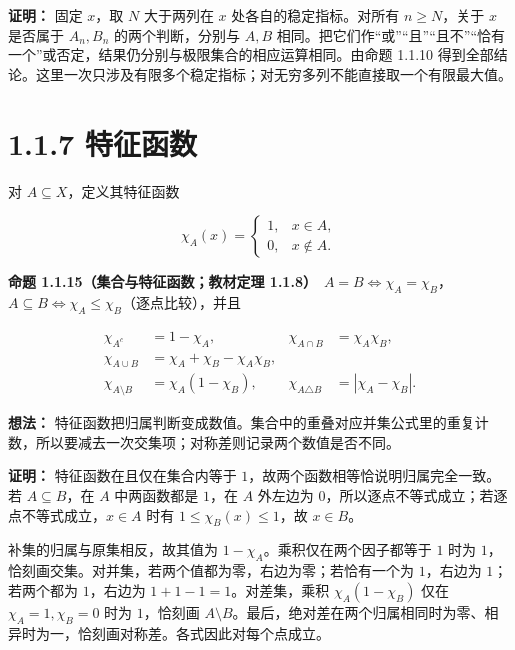 \documentclass[11pt,a4paper]{article}
\begin{document}
\textbf{证明：} 固定 \(x\)，取 \(N\) 大于两列在 \(x\)
处各自的稳定指标。对所有 \(n\ge N\)，关于 \(x\) 是否属于 \(A_n,B_n\)
的两个判断，分别与 \(A,B\)
相同。把它们作``或''``且''``且不''``恰有一个''或否定，结果仍分别与极限集合的相应运算相同。由命题
1.1.10
得到全部结论。这里一次只涉及有限多个稳定指标；对无穷多列不能直接取一个有限最大值。

\section[\S{}1.1.7 特征函数]{1.1.7 特征函数}\label{ux7279ux5f81ux51fdux6570}

对 \(A\subseteq X\)，定义其特征函数

\begin{equation*}
\chi_A(x)=\begin{cases}1,&x\in A,\\0,&x\notin A.\end{cases}
\tag{1.1.19}
\end{equation*}

\textbf{命题 1.1.15（集合与特征函数；教材定理
1.1.8）}　\(A=B\iff\chi_A=\chi_B\)，\(A\subseteq B\iff\chi_A\le\chi_B\)（逐点比较），并且

\begin{equation*}
\begin{aligned}
\chi_{A^c}&=1-\chi_A,&\chi_{A\cap B}&=\chi_A\chi_B,\\
\chi_{A\cup B}&=\chi_A+\chi_B-\chi_A\chi_B,\\
\chi_{A\setminus B}&=\chi_A(1-\chi_B),&
\chi_{A\triangle B}&=|\chi_A-\chi_B|.
\end{aligned}\tag{1.1.20}
\end{equation*}

\textbf{想法：}
特征函数把归属判断变成数值。集合中的重叠对应并集公式里的重复计数，所以要减去一次交集项；对称差则记录两个数值是否不同。

\textbf{证明：} 特征函数在且仅在集合内等于
\(1\)，故两个函数相等恰说明归属完全一致。若 \(A\subseteq B\)，在 \(A\)
中两函数都是 \(1\)，在 \(A\) 外左边为
\(0\)，所以逐点不等式成立；若逐点不等式成立，\(x\in A\) 时有
\(1\le\chi_B(x)\le1\)，故 \(x\in B\)。

补集的归属与原集相反，故其值为 \(1-\chi_A\)。乘积仅在两个因子都等于
\(1\) 时为
\(1\)，恰刻画交集。对并集，若两个值都为零，右边为零；若恰有一个为
\(1\)，右边为 \(1\)；若两个都为 \(1\)，右边为 \(1+1-1=1\)。对差集，乘积
\(\chi_A(1-\chi_B)\) 仅在 \(\chi_A=1,\chi_B=0\) 时为 \(1\)，恰刻画
\(A\setminus B\)。最后，绝对差在两个归属相同时为零、相异时为一，恰刻画对称差。各式因此对每个点成立。
\end{document}
